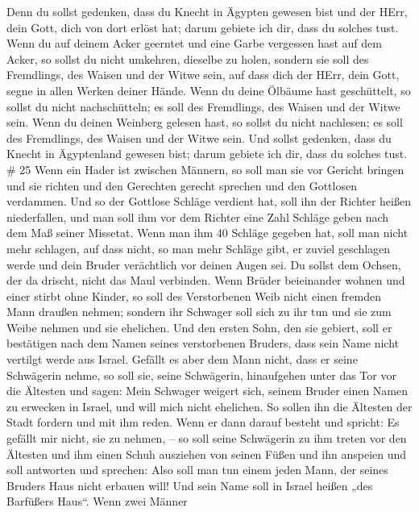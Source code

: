  Denn du sollst gedenken, dass du Knecht in Ägypten gewesen
bist und der HErr, dein Gott, dich von dort erlöst hat; darum gebiete
ich dir, dass du solches tust.  Wenn du auf deinem Acker
geerntet und eine Garbe vergessen hast auf dem Acker, so sollst du nicht
umkehren, dieselbe zu holen, sondern sie soll des Fremdlings, des Waisen
und der Witwe sein, auf dass dich der HErr, dein Gott, segne in allen
Werken deiner Hände.  Wenn du deine Ölbäume hast
geschüttelt, so sollst du nicht nachschütteln; es soll des Fremdlings,
des Waisen und der Witwe sein.  Wenn du deinen Weinberg
gelesen hast, so sollst du nicht nachlesen; es soll des Fremdlings, des
Waisen und der Witwe sein.  Und sollst gedenken, dass du
Knecht in Ägyptenland gewesen bist; darum gebiete ich dir, dass du
solches tust. \# 25  Wenn ein Hader ist zwischen Männern, so
soll man sie vor Gericht bringen und sie richten und den Gerechten
gerecht sprechen und den Gottlosen verdammen.  Und so der
Gottlose Schläge verdient hat, soll ihn der Richter heißen niederfallen,
und man soll ihm vor dem Richter eine Zahl Schläge geben nach dem Maß
seiner Missetat.  Wenn man ihm 40 Schläge gegeben hat, soll
man nicht mehr schlagen, auf dass nicht, so man mehr Schläge gibt, er
zuviel geschlagen werde und dein Bruder verächtlich vor deinen Augen
sei.  Du sollst dem Ochsen, der da drischt, nicht das Maul
verbinden.  Wenn Brüder beieinander wohnen und einer stirbt
ohne Kinder, so soll des Verstorbenen Weib nicht einen fremden Mann
draußen nehmen; sondern ihr Schwager soll sich zu ihr tun und sie zum
Weibe nehmen und sie ehelichen.  Und den ersten Sohn, den
sie gebiert, soll er bestätigen nach dem Namen seines verstorbenen
Bruders, dass sein Name nicht vertilgt werde aus Israel. 
Gefällt es aber dem Mann nicht, dass er seine Schwägerin nehme, so soll
sie, seine Schwägerin, hinaufgehen unter das Tor vor die Ältesten und
sagen: Mein Schwager weigert sich, seinem Bruder einen Namen zu erwecken
in Israel, und will mich nicht ehelichen.  So sollen ihn die
Ältesten der Stadt fordern und mit ihm reden. Wenn er dann darauf
besteht und spricht: Es gefällt mir nicht, sie zu nehmen, --
 so soll seine Schwägerin zu ihm treten vor den Ältesten und
ihm einen Schuh ausziehen von seinen Füßen und ihn anspeien und soll
antworten und sprechen: Also soll man tun einem jeden Mann, der seines
Bruders Haus nicht erbauen will!  Und sein Name soll in
Israel heißen „des Barfüßers Haus``.  Wenn zwei Männer
